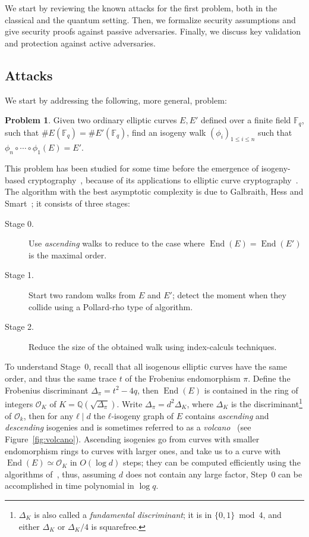 \documentclass{article}
\newcommand{\F}{\mathbb{F}}
\renewcommand{\O}{\mathcal{O}}
\theoremstyle{definition}
\newtheorem{prob}[theorem]{Problem}
\DeclareMathOperator{\End}{End}
\begin{document}
We start by reviewing the known attacks for the first problem, both in
the classical and the quantum setting. Then, we formalize security
assumptions and give security proofs against passive adversaries.
Finally, we discuss key validation and protection against active
adversaries.

\subsection{Attacks}
\label{sec:attacks}

We start by addressing the following, more general, problem:

\begin{prob}
  Given two ordinary elliptic curves $E,E'$ defined over a finite
  field $\F_q$, such that $\#E(\F_q)=\#E'(\F_q)$, find an isogeny walk
  $(ϕ_i)_{1≤i≤n}$ such that $ϕ_n∘\cdots∘ϕ_1(E)=E'$.
\end{prob}

This problem has been studied for some time before the emergence of
isogeny-based cryptography~\cite{Gal,GHS,galbraith+stolbunov11},
because of its applications to elliptic curve
cryptography~\cite{GHS,teske06,jao+miller+venkatesan09}.  The
algorithm with the best asymptotic complexity is due to Galbraith,
Hess and Smart~\cite{GHS}; it consists of three stages:
\begin{description}
\item[Stage 0.] Use \emph{ascending} walks to reduce to the case where
  $\End(E)=\End(E')$ is the maximal order.
\item[Stage 1.] Start two random walks from $E$ and $E'$; detect the
  moment when they collide using a Pollard-rho type of algorithm.
\item[Stage 2.] Reduce the size of the obtained walk using
  index-calculs techniques.
\end{description}

To understand Stage~0, recall that all isogenous elliptic curves have
the same order, and thus the same trace $t$ of the Frobenius
endomorphism $π$. Define the Frobenius discriminant $Δ_π=t^2-4q$, then
$\End(E)$ is contained in the ring of integers $\O_K$ of
$K=ℚ(\sqrt{Δ_π})$. Write $Δ_π=d^2Δ_K$, where $Δ_K$ is the
discriminant\footnote{$Δ_K$ is also called a \emph{fundamental
    discriminant}; it is in $\{0,1\}\bmod 4$, and either $Δ_K$ or
  $Δ_K/4$ is squarefree.} of $\O_k$, then for any $ℓ\mid d$ the
$ℓ$-isogeny graph of $E$ contains \emph{ascending} and
\emph{descending} isogenies and is sometimes referred to as a
\emph{volcano}~\cite{fouquet+morain02} (see Figure~\ref{fig:volcano}).
Ascending isogenies go from curves with smaller endomorphism rings to
curves with larger ones, and take us to a curve with $\End(E)≃\O_K$ in
$O(\log d)$ steps; they can be computed efficiently using the
algorithms
of~\cite{kohel,fouquet+morain02,ionica+joux13,defeo2016explicit},
thus, assuming $d$ does not contain any large factor, Step~0 can be
accomplished in time polynomial in $\log q$.
\end{document}
